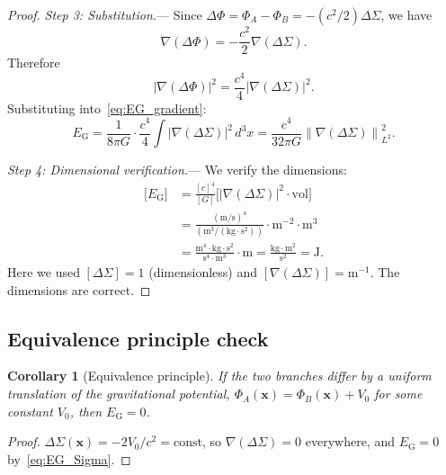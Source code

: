 \documentclass[letterpaper,twocolumn,superscriptaddress,longbibliography]{revtex4-2}
\newtheorem{corollary}[theorem]{Corollary}
\newcommand{\norm}[1]{\left\|#1\right\|}
\newcommand{\EG}{E_{\mathrm{G}}}
\newcommand{\DSigma}{\Delta\Sigma}
\newcommand{\DPhi}{\Delta\Phi}
\begin{document}
\begin{proof}
\emph{Step 3: Substitution.}---
Since $\DPhi = \Phi_A - \Phi_B = -(c^2/2)\DSigma$, we have
\begin{equation}
  \nabla(\DPhi) = -\frac{c^2}{2}\nabla(\DSigma).
  \label{eq:grad_relation}
\end{equation}
Therefore
\begin{equation}
  |\nabla(\DPhi)|^2 = \frac{c^4}{4}|\nabla(\DSigma)|^2.
  \label{eq:grad_sq}
\end{equation}
Substituting into~\eqref{eq:EG_gradient}:
\begin{equation}
  \EG = \frac{1}{8\pi G} \cdot \frac{c^4}{4}
        \int |\nabla(\DSigma)|^2 \, d^3x
      = \frac{c^4}{32\pi G}
        \norm{\nabla(\DSigma)}^2_{L^2}.
  \label{eq:EG_final}
\end{equation}

\emph{Step 4: Dimensional verification.}---
We verify the dimensions:
\begin{align}
  \bigl[\EG\bigr]
  &= \frac{[c]^4}{[G]}
     \bigl[|\nabla(\DSigma)|^2 \cdot \mathrm{vol}\bigr]
  \nonumber \\
  &= \frac{(\mathrm{m/s})^4}{(\mathrm{m^3/(kg\cdot s^2)})}
     \cdot \mathrm{m}^{-2} \cdot \mathrm{m}^3
  \nonumber \\
  &= \frac{\mathrm{m^4 \cdot kg \cdot s^2}}
          {\mathrm{s^4 \cdot m^3}} \cdot \mathrm{m}
  = \frac{\mathrm{kg \cdot m^2}}{\mathrm{s^2}}
  = \mathrm{J}.
  \label{eq:dim_check}
\end{align}
Here we used $[\DSigma] = 1$ (dimensionless) and
$[\nabla(\DSigma)] = \mathrm{m}^{-1}$.
The dimensions are correct.
\end{proof}

\subsection{Equivalence principle check}

\begin{corollary}[Equivalence principle]
\label{cor:EP}
If the two branches differ by a uniform translation of the
gravitational potential, $\Phi_A(\bm{x}) = \Phi_B(\bm{x}) + V_0$
for some constant $V_0$, then $\EG = 0$.
\end{corollary}

\begin{proof}
$\DSigma(\bm{x}) = -2V_0/c^2 = \mathrm{const}$, so
$\nabla(\DSigma) = 0$ everywhere, and $\EG = 0$
by~\eqref{eq:EG_Sigma}.
\end{proof}
\end{document}
